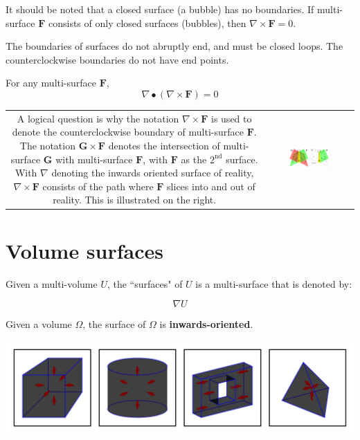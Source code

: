 \begin{thm}
It should be noted that a closed surface (a bubble) has no boundaries. If multi-surface \(\mathbf{F}\) consists of only closed surfaces (bubbles), then \(\nabla \times \mathbf{F} = 0\). 
\end{thm}

The boundaries of surfaces do not abruptly end, and must be closed loops. The counterclockwise boundaries do not have end points. 
\begin{thm}
For any multi-surface \(\mathbf{F}\), 
\[\nabla \bullet (\nabla \times \mathbf{F}) = 0\]
\end{thm}

\begin{tabular}{cc}
\parbox{0.5\textwidth}{
A logical question is why the notation \(\nabla \times \mathbf{F}\) is used to denote the counterclockwise boundary of multi-surface \(\mathbf{F}\). The notation \(\mathbf{G} \times \mathbf{F}\) denotes the intersection of multi-surface \(\mathbf{G}\) with multi-surface \(\mathbf{F}\), with \(\mathbf{F}\) as the \(2^\text{nd}\) surface. With \(\nabla\) denoting the inwards oriented surface of reality, \(\nabla \times \mathbf{F}\) consists of the path where \(\mathbf{F}\) slices into and out of reality. This is illustrated on the right.
} & \parbox{0.5\textwidth}{
\includegraphics[width = 0.5\textwidth]{Boundaries/Surface_boundaries/right_hand_rule_for_boundaries}
}
\end{tabular}




\section{Volume surfaces}

Given a multi-volume \(U\), the ``surfaces" of \(U\) is a multi-surface that is denoted by: 

\[\nabla U\]

Given a volume \(\Omega\), the surface of \(\Omega\) is {\bf inwards-oriented}. 

\begin{center}
\includegraphics[width = \textwidth]{Boundaries/Volume_inwards_oriented_surfaces/volume_surface_examples}
\end{center}

